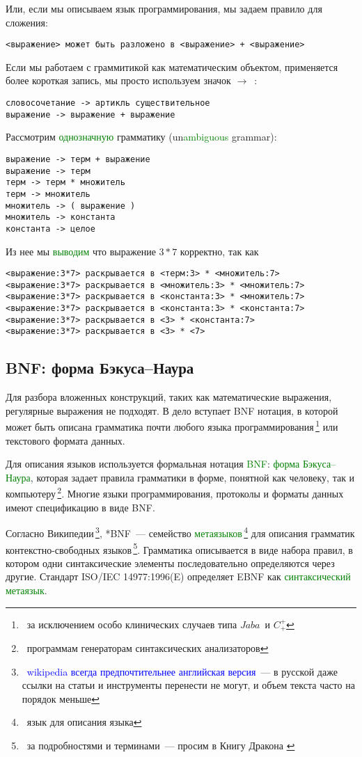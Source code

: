 \documentclass[oneside,10pt]{article}
\renewcommand{\emph}[1]{\textcolor{blue}{#1}}
\newcommand{\note}[1]{\,\footnote{\ #1}}
\newcommand{\term}[1]{\textcolor{green}{#1}}
\newcommand{\cpp}{$C^+_+$}
\newcommand{\java}{$Jaba$}
\begin{document}
\clearpage
Или, если мы описываем язык программирования, мы задаем правило для сложения:
\begin{verbatim}
<выражение> может быть разложено в <выражение> + <выражение> 
\end{verbatim}

Если мы работаем с граммитикой как математическим объектом, применяется более
короткая запись, мы просто используем значок $\rightarrow$\ :
\begin{verbatim}
словосочетание -> артикль существительное
выражение -> выражение + выражение
\end{verbatim}

\clearpage
Рассмотрим \term{однозначную} грамматику (un\term{ambiguous} grammar):
\begin{verbatim}
выражение -> терм + выражение
выражение -> терм
терм -> терм * множитель
терм -> множитель
множитель -> ( выражение )
множитель -> константа
константа -> целое 
\end{verbatim}

Из нее мы \term{выводим} что выражение $3*7$ корректно, так как
\begin{verbatim}
<выражение:3*7> раскрывается в <терм:3> * <множитель:7>
<выражение:3*7> раскрывается в <множитель:3> * <множитель:7>
<выражение:3*7> раскрывается в <константа:3> * <множитель:7>
<выражение:3*7> раскрывается в <константа:3> * <константа:7>
<выражение:3*7> раскрывается в <3> * <константа:7>
<выражение:3*7> раскрывается в <3> * <7>
\end{verbatim}

\subsection{BNF: форма Бэкуса--Наура}

Для разбора вложенных конструкций, таких как математические выражения,
регулярные выражения не подходят. В дело вступает BNF нотация, в которой может
быть описана грамматика почти любого языка программирования\note{за исключением
особо клинических случаев типа \java\ и \cpp} или текстового формата данных.

Для описания языков используется формальная нотация \term{BNF}: \term{форма
Бэ\-ку\-са--Наура}, которая задает правила грамматики в форме, понятной как
человеку, так и компьютеру\note{программам генераторам синтаксических
анализаторов}. Многие языки программирования, протоколы и форматы данных имеют
спецификацию в виде BNF.

\clearpage
Согласно Википедии\note{\emph{wikipedia всегда предпочтительнее английская
версия}\ --- в русской даже ссылки на статьи и инструменты перенести не могут, и
объем текста часто на порядок меньше}, *BNF\ --- семейство
\term{метаязыков}\note{язык для описания языка} для описания грамматик
контекстно-свободных языков\note{за подробностями и терминами\ --- просим в
Книгу Дракона \cite{dragon}}. Грамматика описывается в виде набора правил, в
котором одни синтаксические элементы последовательно определяются через другие.
Стандарт ISO/IEC 14977:1996(E) определяет EBNF как \term{синтаксический
метаязык}.
\end{document}
